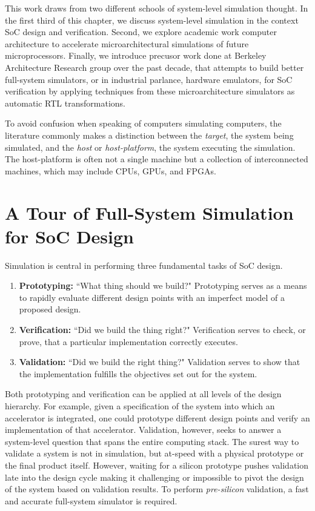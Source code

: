 This work draws from two different schools of system-level simulation thought.
In the first third of this chapter, we discuss system-level simulation in the
context SoC design and verification. Second, we explore academic work computer
architecture to accelerate microarchitectural simulations of future
microprocessors. Finally, we introduce precusor work done at Berkeley
Architecture Research group over the past decade, that attempts to build better
full-system simulators, or in industrial parlance, hardware emulators, for SoC
verification by applying techniques from these microarchitecture simulators as
automatic RTL transformations.

To avoid confusion when speaking of computers simulating computers, the
literature commonly makes a distinction between the \emph{target}, the system
being simulated, and the \emph{host} or \emph{host-platform}, the system
executing the simulation. The host-platform is often not a single machine but
a collection of interconnected machines, which may include CPUs,
GPUs, and FPGAs.

\section{A Tour of Full-System Simulation for SoC Design}

Simulation is central in performing three fundamental tasks of SoC design.

\begin{enumerate}

    \item \textbf{Prototyping:} ``What thing should we
        build?" Prototyping serves as a means to rapidly evaluate different
        design points with an imperfect model of a proposed design.

    \item \textbf{Verification:} ``Did we build the thing right?" Verification
        serves to check, or prove, that a particular implementation
        correctly executes.

    \item \textbf{Validation:} ``Did we build the right thing?" Validation
        serves to show that the implementation fulfills the objectives set out
        for the system.

\end{enumerate}

Both prototyping and verification can be applied at all levels of the design
hierarchy.  For example, given a specification of the system into which an
accelerator is integrated, one could prototype different design points and
verify an implementation of that accelerator. Validation, however, seeks to
answer a system-level question that spans the entire computing stack.  The
surest way to validate a system is not in simulation, but at-speed with a
physical prototype or the final product itself. However, waiting for a silicon
prototype pushes validation late into the design cycle making it challenging or
impossible to pivot the design of the system based on validation results. To
perform \emph{pre-silicon} validation, a fast and accurate full-system
simulator is required.

